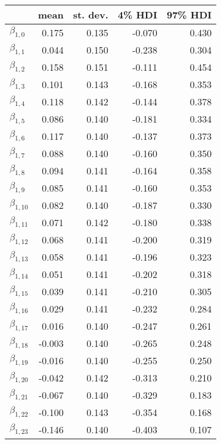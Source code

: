 \begin{tabular}{lrrrr}
\toprule
{} &   mean &  st. dev. &  4\% HDI &  97\% HDI \\
\midrule
$\beta_{1,0}$  &  0.175 &     0.135 &   -0.070 &     0.430 \\
$\beta_{1,1}$  &  0.044 &     0.150 &   -0.238 &     0.304 \\
$\beta_{1,2}$  &  0.158 &     0.151 &   -0.111 &     0.454 \\
$\beta_{1,3}$  &  0.101 &     0.143 &   -0.168 &     0.353 \\
$\beta_{1,4}$  &  0.118 &     0.142 &   -0.144 &     0.378 \\
$\beta_{1,5}$  &  0.086 &     0.140 &   -0.181 &     0.334 \\
$\beta_{1,6}$  &  0.117 &     0.140 &   -0.137 &     0.373 \\
$\beta_{1,7}$  &  0.088 &     0.140 &   -0.160 &     0.350 \\
$\beta_{1,8}$  &  0.094 &     0.141 &   -0.164 &     0.358 \\
$\beta_{1,9}$  &  0.085 &     0.141 &   -0.160 &     0.353 \\
$\beta_{1,10}$ &  0.082 &     0.140 &   -0.187 &     0.330 \\
$\beta_{1,11}$ &  0.071 &     0.142 &   -0.180 &     0.338 \\
$\beta_{1,12}$ &  0.068 &     0.141 &   -0.200 &     0.319 \\
$\beta_{1,13}$ &  0.058 &     0.141 &   -0.196 &     0.323 \\
$\beta_{1,14}$ &  0.051 &     0.141 &   -0.202 &     0.318 \\
$\beta_{1,15}$ &  0.039 &     0.141 &   -0.210 &     0.305 \\
$\beta_{1,16}$ &  0.029 &     0.141 &   -0.232 &     0.284 \\
$\beta_{1,17}$ &  0.016 &     0.140 &   -0.247 &     0.261 \\
$\beta_{1,18}$ & -0.003 &     0.140 &   -0.265 &     0.248 \\
$\beta_{1,19}$ & -0.016 &     0.140 &   -0.255 &     0.250 \\
$\beta_{1,20}$ & -0.042 &     0.142 &   -0.313 &     0.210 \\
$\beta_{1,21}$ & -0.067 &     0.140 &   -0.329 &     0.183 \\
$\beta_{1,22}$ & -0.100 &     0.143 &   -0.354 &     0.168 \\
$\beta_{1,23}$ & -0.146 &     0.140 &   -0.403 &     0.107 \\

\end{tabular}
